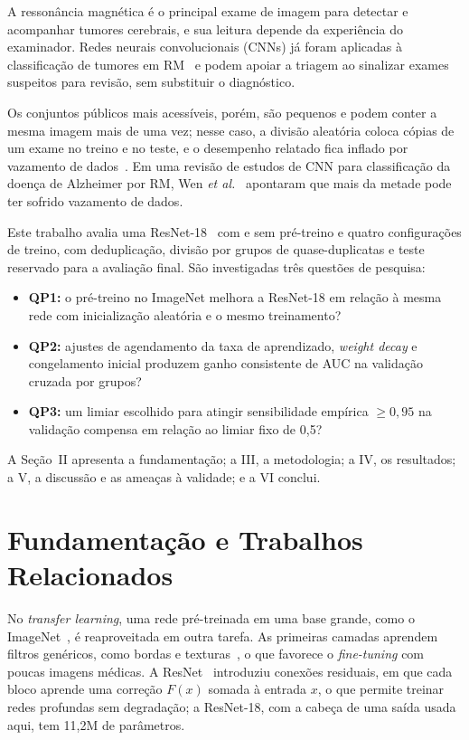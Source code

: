 \documentclass[conference]{IEEEtran}
\begin{document}
A ressonância magnética é o principal exame de imagem para detectar e acompanhar tumores cerebrais, e sua leitura depende da experiência do examinador. Redes neurais convolucionais (CNNs) já foram aplicadas à classificação de tumores em RM~\cite{swati2019brain,deepak2019brain} e podem apoiar a triagem ao sinalizar exames suspeitos para revisão, sem substituir o diagnóstico.

Os conjuntos públicos mais acessíveis, porém, são pequenos e podem conter a mesma imagem mais de uma vez; nesse caso, a divisão aleatória coloca cópias de um exame no treino e no teste, e o desempenho relatado fica inflado por vazamento de dados~\cite{kapoor2023leakage}. Em uma revisão de estudos de CNN para classificação da doença de Alzheimer por RM, Wen \textit{et al.}~\cite{wen2020alzheimer} apontaram que mais da metade pode ter sofrido vazamento de dados.

Este trabalho avalia uma ResNet-18~\cite{he2016resnet} com e sem pré-treino e quatro configurações de treino, com deduplicação, divisão por grupos de quase-duplicatas e teste reservado para a avaliação final. São investigadas três questões de pesquisa:
\begin{itemize}
\item \textbf{QP1:} o pré-treino no ImageNet melhora a ResNet-18 em relação à mesma rede com inicialização aleatória e o mesmo treinamento?
\item \textbf{QP2:} ajustes de agendamento da taxa de aprendizado, \textit{weight decay} e congelamento inicial produzem ganho consistente de AUC na validação cruzada por grupos?
\item \textbf{QP3:} um limiar escolhido para atingir sensibilidade empírica $\ge0{,}95$ na validação compensa em relação ao limiar fixo de 0,5?
\end{itemize}
A Seção~II apresenta a fundamentação; a III, a metodologia; a IV, os resultados; a V, a discussão e as ameaças à validade; e a VI conclui.

\section{Fundamentação e Trabalhos Relacionados}

No \textit{transfer learning}, uma rede pré-treinada em uma base grande, como o ImageNet~\cite{deng2009imagenet}, é reaproveitada em outra tarefa. As primeiras camadas aprendem filtros genéricos, como bordas e texturas~\cite{yosinski2014transferable}, o que favorece o \textit{fine-tuning} com poucas imagens médicas. A ResNet~\cite{he2016resnet} introduziu conexões residuais, em que cada bloco aprende uma correção $F(x)$ somada à entrada $x$, o que permite treinar redes profundas sem degradação; a ResNet-18, com a cabeça de uma saída usada aqui, tem 11,2M de parâmetros.
\end{document}
